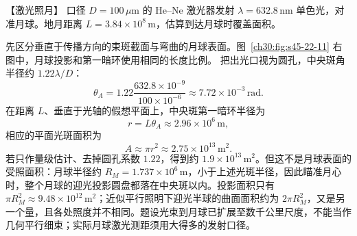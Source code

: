 \begin{origexamplebox}{【激光照月】}\label{ch30:ex:s45-22-4}
口径 $D=100\,\mu\mathrm m$ 的 He--Ne 激光器发射 $\lambda=632.8\,\mathrm{nm}$ 单色光，对准月球。地月距离 $L=3.84\times10^8\,\mathrm m$，估算到达月球时覆盖面积。

\begin{center}\begin{minipage}{.96\linewidth}\centering
{}
\end{minipage}\end{center}
\end{origexamplebox}\par\nopagebreak[3]
\begin{xesolution}
先区分垂直于传播方向的束斑截面与弯曲的月球表面。图~\ref{ch30:fig:s45-22-11} 右图中，月球投影和第一暗环使用相同的长度比例。
\LaserMoonDiagram
把出光口视为圆孔，中央斑角半径约 $1.22\lambda/D$：
\[
 \theta_A=1.22\frac{632.8\times10^{-9}}{100\times10^{-6}}
 \approx7.72\times10^{-3}\,\mathrm{rad}.
\]
在距离 $L$、垂直于光轴的假想平面上，中央斑第一暗环半径为
\[
 r=L\theta_A\approx2.96\times10^6\,\mathrm m,
\]
相应的平面光斑面积为
\[
 \boxed{A\approx\pi r^2\approx2.75\times10^{13}\,\mathrm{m^2}}.
\]
若只作量级估计、去掉圆孔系数 $1.22$，得到约 $1.9\times10^{13}\,\mathrm{m^2}$。但这不是月球表面的受照面积：月球半径约 $R_M=1.737\times10^6\,\mathrm m$，小于上述光斑半径，因此瞄准月心时，整个月球的迎光投影圆盘都落在中央斑以内。投影面积只有 $\pi R_M^2\approx9.48\times10^{12}\,\mathrm{m^2}$；近似平行照明下迎光半球的曲面面积约为 $2\pi R_M^2$，又是另一个量，且各处照度并不相同。题设光束到月球已扩展至数千公里尺度，不能当作几何平行细束；实际月球激光测距须用大得多的发射口径。
\end{xesolution}

